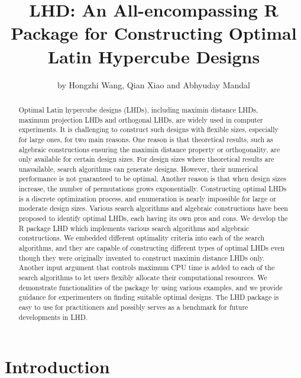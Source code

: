
\title{LHD: An All-encompassing R Package for Constructing Optimal Latin Hypercube Designs}
\author{by Hongzhi Wang, Qian Xiao and Abhyuday Mandal}

\maketitle

\begin{abstract}
Optimal Latin hypercube designs (LHDs), including maximin distance LHDs, maximum projection LHDs and orthogonal LHDs, are widely used in computer experiments. It is challenging to construct such designs with flexible sizes, especially for large ones, for two main reasons.
One reason is that theoretical results, such as algebraic constructions ensuring the maximin distance property or orthogonality, are only available for certain design sizes. For design sizes where theoretical results are unavailable, search algorithms can generate designs. However, their numerical performance is not guaranteed to be optimal. Another reason is that when design sizes increase, the number of permutations grows exponentially. Constructing optimal LHDs is a discrete optimization process, and enumeration is nearly impossible for large or moderate design sizes. Various search algorithms and algebraic constructions have been proposed to identify optimal LHDs, each having its own pros and cons. We develop the R package LHD which implements various search algorithms and algebraic constructions. We embedded different optimality criteria into each of the search algorithms, and they are capable of constructing different types of optimal LHDs even though they were originally invented to construct maximin distance LHDs only. Another input argument that controls maximum CPU time is added to each of the search algorithms to let users flexibly allocate their computational resources. We demonstrate functionalities of the package by using various examples, and we provide guidance for experimenters on finding suitable optimal designs. The LHD package is easy to use for practitioners and possibly serves as a benchmark for future developments in LHD.
\end{abstract}

\section{Introduction}

